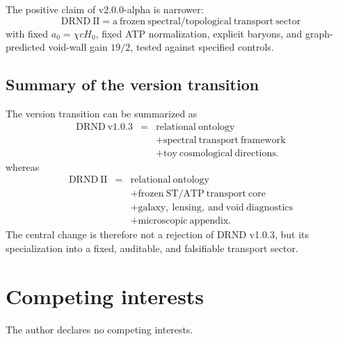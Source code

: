 \documentclass[12pt]{iopart}
\begin{document}
The positive claim of v2.0.0-alpha is narrower:
\begin{equation}
\mathrm{DRND\ II}
=
\mathrm{a\ frozen\ spectral/topological\ transport\ sector}
\end{equation}
with fixed \(a_0=\chi cH_0\), fixed ATP normalization, explicit baryons, and graph-predicted void-wall gain \(19/2\), tested against specified controls.

\subsection{Summary of the version transition}

The version transition can be summarized as
\begin{eqnarray}
\mathrm{DRND\ v1.0.3}
&=&
\mathrm{relational\ ontology}
\nonumber\\
&&+
\mathrm{spectral\ transport\ framework}
\nonumber\\
&&+
\mathrm{toy\ cosmological\ directions}.
\nonumber
\end{eqnarray}
whereas
\begin{eqnarray}
\mathrm{DRND\ II}
&=&
\mathrm{relational\ ontology}
\nonumber\\
&&+
\mathrm{frozen\ ST/ATP\ transport\ core}
\nonumber\\
&&+
\mathrm{galaxy,\ lensing,\ and\ void\ diagnostics}
\nonumber\\
&&+
\mathrm{microscopic\ appendix}.
\nonumber
\end{eqnarray}
The central change is therefore not a rejection of DRND v1.0.3, but its specialization into a fixed, auditable, and falsifiable transport sector.

\section*{Competing interests}
The author declares no competing interests.
\end{document}
